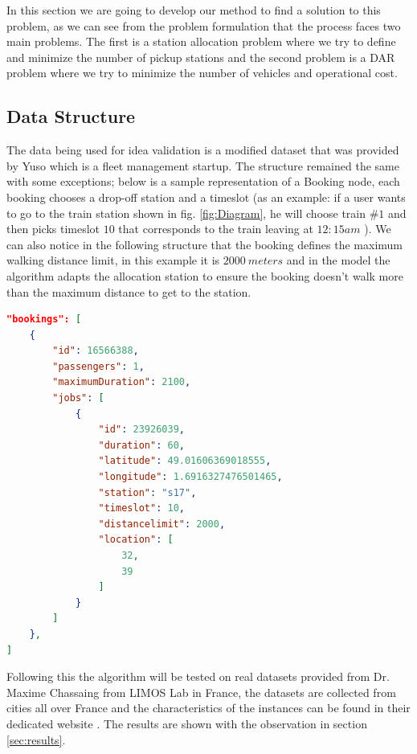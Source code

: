 \documentclass{article}
\begin{document}

In this section we are going to develop our method to find a solution to this problem, as we can see from the problem formulation that the process faces two main problems. The first is a station allocation problem where we try to define and minimize the number of pickup stations and the second problem is a DAR problem where we try to minimize the number of vehicles and operational cost.


\subsection{Data Structure}
\label{sec:data_struc}

The data being used for idea validation is a modified dataset that was provided by Yuso which is a fleet management startup. The structure remained the same with some exceptions; below is a sample representation of a Booking node, each booking chooses a drop-off station and a timeslot (as an example: if a user wants to go to the train station shown in fig. \ref{fig:Diagram}, he will choose train $\#1$ and then picks timeslot $10$ that corresponds to the train leaving at $12:15am$ ). We can also notice in the following structure that the booking defines the maximum walking distance limit, in this example it is $2000\  meters$ and in the model the algorithm adapts the allocation station to ensure the booking doesn't walk more than the maximum distance to get to the station. 
\begin{lstlisting}[language=json,firstnumber=1]
"bookings": [
    {
        "id": 16566388,
        "passengers": 1,
        "maximumDuration": 2100,
        "jobs": [
            {
                "id": 23926039,
                "duration": 60,
                "latitude": 49.01606369018555,
                "longitude": 1.6916327476501465,
                "station": "s17",
                "timeslot": 10,
                "distancelimit": 2000,
                "location": [
                    32,
                    39
                ]
            }
        ]
    },
]
\end{lstlisting}

Following this the algorithm will be tested on real datasets provided from Dr. Maxime Chassaing from LIMOS Lab in France, the datasets are collected from cities all over France and the characteristics of the instances can be found in their dedicated website \cite{darp_instances}. The results are shown with the observation in section \ref{sec:results}.
\end{document}
